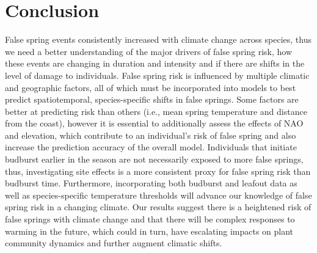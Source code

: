 \documentclass{article}\usepackage[]{graphicx}\usepackage[]{color}
\begin{document}
\section*{Conclusion}
False spring events consistently increased with climate change across species, thus we need a better understanding of the major drivers of false spring risk, how these events are changing in duration and intensity and if there are shifts in the level of damage to individuals. False spring risk is influenced by multiple climatic and geographic factors, all of which must be incorporated into models to best predict spatiotemporal, species-specific shifts in false springs. Some factors are better at predicting risk than others (i.e., mean spring temperature and distance from the coast), however it is essential to additionally assess the effects of NAO and elevation, which contribute to an individual's risk of false spring and also increase the prediction accuracy of the overall model. Individuals that initiate budburst earlier in the season are not necessarily exposed to more false springs, thus, investigating site effects is a more consistent proxy for false spring risk than budburst time. %
Furthermore, incorporating both budburst and leafout data as well as species-specific temperature thresholds will advance our knowledge of false spring risk in a changing climate. Our results suggest there is a heightened risk of false springs with climate change and that there will be complex responses to warming in the future, which could in turn, have escalating impacts on plant community dynamics and further augment climatic shifts.  
\end{document}
